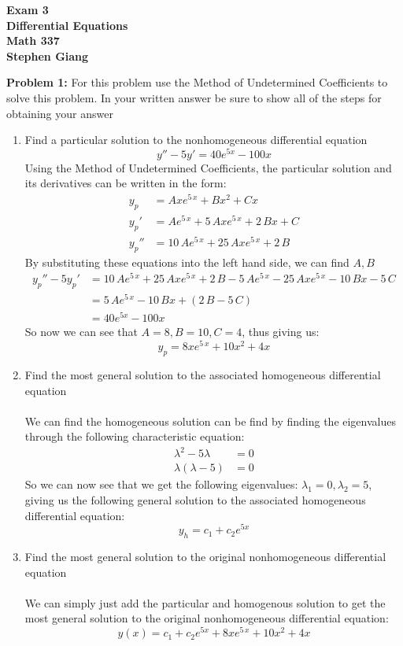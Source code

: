 \documentclass[12pt]{article}
\begin{document}
	
	\begin{center}
		\textbf{Exam 3} \\
		\textbf{Differential Equations} \\
		\textbf{Math 337} \\
		\textbf{Stephen Giang} \\
	\end{center}

\noindent \textbf{Problem 1: }For this problem use the Method of Undetermined Coefficients to solve this problem. In your written answer be sure to show all of the steps for obtaining your answer
\\ 
	\begin{enumerate}[label = (\alph*)]
		\item Find a particular solution to the nonhomogeneous differential equation
			$$
			y'' - 5y' = 40e^{5x} - 100x
			$$
		Using the Method of Undetermined Coefficients, the particular solution and its derivatives can be written in the form:
			\begin{align*}
				y_p &= Ax{{e}^{5\,x}}+B{x}^{2}+Cx \\
				y_p' &= A{{e}^{5\,x}}+5\,Ax{{e}^{5\,x}}+2\,Bx+C \\
				y_p'' &= 10\,A{{e}^{5\,x}}+25\,Ax{{e}^{5\,x}}+2\,B
			\end{align*}
		By substituting these equations into the left hand side, we can find $A,B$ 
			\begin{align*}
				y_p'' - 5y_p' &= 10\,A{{e}^{5\,x}}+25\,Ax{{e}^{5\,x}}+2\,B -5\,A{{e}^{5\,x}}-25\,Ax{{ e}^{5\,x}}-10\,Bx-5\,C \\
				&= 5\,A{{e}^{5\,x}}-10\,Bx + (2\,B-5\,C) \\
				&= 40e^{5x} - 100x
			\end{align*}
		So now we can see that $A = 8, B = 10, C = 4$, thus giving us:
			\boldmath
			$$
			y_p = 8x{{e}^{5\,x}}+10{x}^{2}+4x
			$$
			\unboldmath
		\item Find the most general solution to the associated homogeneous differential equation
		\\ \\
		We can find the homogeneous solution can be find by finding the eigenvalues through the following characteristic equation:
			\begin{align*}
				\lambda^2 - 5\lambda &= 0 \\
				\lambda(\lambda - 5) &= 0 
			\end{align*} 
		So we can now see that we get the following eigenvalues: $\lambda_1 = 0, \lambda_2 = 5$, giving us the following general solution to the associated homogeneous differential equation:
			\boldmath
			$$
			y_h = c_1 + c_2e^{5x}
			$$
			\unboldmath
		\item Find the most general solution to the original nonhomogeneous differential equation
		\\ \\
		We can simply just add the particular and homogenous solution to get the most general solution to the original nonhomogeneous differential equation:	
			\boldmath
			$$
			y(x) = c_1 + c_2e^{5x} + 8x{{e}^{5\,x}}+10{x}^{2}+4x
			$$
			\unboldmath
	\end{enumerate}
\end{document}
